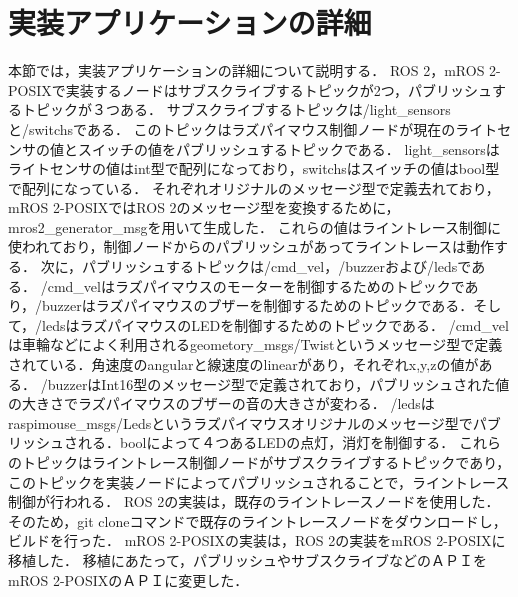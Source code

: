 \section{実装アプリケーションの詳細}
本節では，実装アプリケーションの詳細について説明する．
ROS 2，mROS 2-POSIXで実装するノードはサブスクライブするトピックが2つ，パブリッシュするトピックが３つある．
サブスクライブするトピックは/light\_sensorsと/switchsである．
このトピックはラズパイマウス制御ノードが現在のライトセンサの値とスイッチの値をパブリッシュするトピックである．
light\_sensorsはライトセンサの値はint型で配列になっており，switchsはスイッチの値はbool型で配列になっている．
それぞれオリジナルのメッセージ型で定義去れており，mROS 2-POSIXではROS 2のメッセージ型を変換するために，mros2\_generator\_msgを用いて生成した．
これらの値はライントレース制御に使われており，制御ノードからのパブリッシュがあってライントレースは動作する．
次に，パブリッシュするトピックは/cmd\_vel，/buzzerおよび/ledsである．
/cmd\_velはラズパイマウスのモーターを制御するためのトピックであり，/buzzerはラズパイマウスのブザーを制御するためのトピックである．そして，/ledsはラズパイマウスのLEDを制御するためのトピックである．
/cmd\_velは車輪などによく利用されるgeometory\_msgs/Twistというメッセージ型で定義されている．角速度のangularと線速度のlinearがあり，それぞれx,y,zの値がある．
/buzzerはInt16型のメッセージ型で定義されており，パブリッシュされた値の大きさでラズパイマウスのブザーの音の大きさが変わる．
/ledsはraspimouse\_msgs/Ledsというラズパイマウスオリジナルのメッセージ型でパブリッシュされる．boolによって４つあるLEDの点灯，消灯を制御する．
これらのトピックはライントレース制御ノードがサブスクライブするトピックであり，このトピックを実装ノードによってパブリッシュされることで，ライントレース制御が行われる．
ROS 2の実装は，既存のライントレースノードを使用した．
そのため，git cloneコマンドで既存のライントレースノードをダウンロードし，ビルドを行った．
mROS 2-POSIXの実装は，ROS 2の実装をmROS 2-POSIXに移植した．
移植にあたって，パブリッシュやサブスクライブなどのＡＰＩをmROS 2-POSIXのＡＰＩに変更した．
